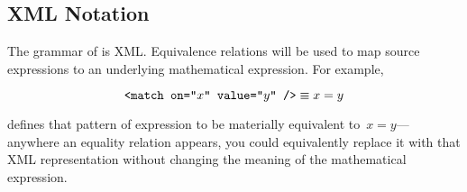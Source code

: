 \subsection{XML Notation}
The grammar of \tame{} is XML.
Equivalence relations will be used to map source expressions to an
  underlying mathematical expression.
For example,

\begin{equation*}
  \texttt{<match on="$x$" value="$y$" />} \equiv x = y
\end{equation*}

\noindent
defines that pattern of  expression to be materially
  equivalent to~$x=y$---%
    anywhere an equality relation appears,
      you could equivalently replace it with that XML representation without
        changing the meaning of the mathematical expression.
